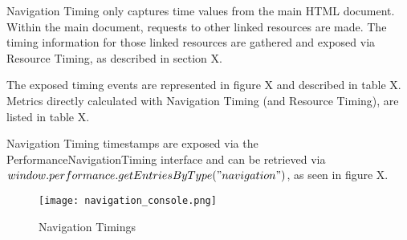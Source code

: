 Navigation Timing only captures time values from the main HTML document.
Within the main document, requests to other linked resources are made.
The timing information for those linked resources are gathered and exposed via Resource Timing, as described in section X. %

The exposed timing events are represented in figure X and described in table X.
Metrics directly calculated with Navigation Timing (and Resource Timing), are listed in table X.



Navigation Timing timestamps are exposed via the PerformanceNavigationTiming interface and can be retrieved via $window.performance.getEntriesByType("navigation")$, as seen in figure X. %







\begin{figure}[h!]
\begin{center}
\texttt{[image: navigation\_console.png]}
\caption{Navigation Timings}
\label{img:navigation_console}
\end{center}
\end{figure}




